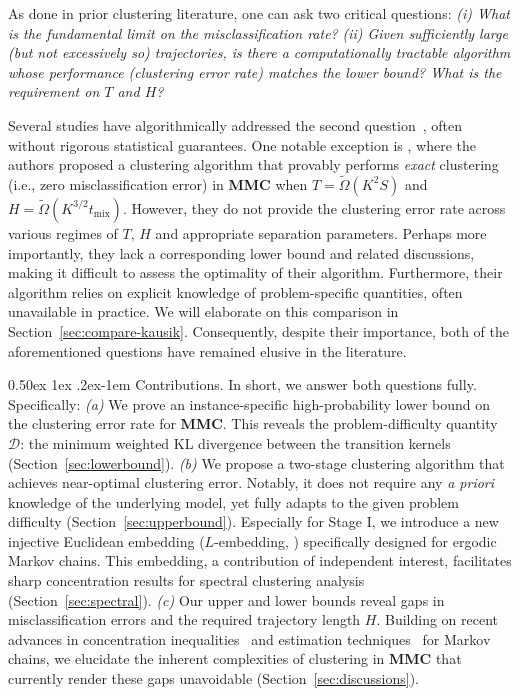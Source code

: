 \documentclass[twoside]{article}
\makeatletter
\renewcommand{\paragraph}{%
  \@startsection{paragraph}{4}%
  {\z@}{0.50ex \@plus 1ex \@minus .2ex}{-1em}%
  {\normalfont\normalsize\bfseries}%
}
\def\gD{{\mathcal{D}}}
\theoremstyle{plain}
\newcommand{\mix}{\mathrm{mix}}
\makeatother
\begin{document}
As done in prior clustering literature, one can ask two critical questions:
\emph{(i) What is the fundamental limit on the misclassification rate?} \emph{(ii) Given sufficiently large (but not excessively so) trajectories, is there a \textit{computationally tractable} algorithm whose performance (clustering error rate) matches the lower bound? What is the requirement on $T$ and $H$?}




Several studies have algorithmically addressed the second question~\citep{gupta2016mixture,kausik2023mixture,spaeh2023mixture,spaeh2024mixture1,spaeh2024mixture2}, often without rigorous statistical guarantees.
One notable exception is \cite{kausik2023mixture}, where the authors proposed a clustering algorithm that provably performs \textit{exact} clustering (i.e., zero misclassification error) in \textbf{MMC} when $T = \widetilde{\Omega}(K^2 S)$ and $H = \widetilde{\Omega}(K^{3/2} t_\mix)$.
However, they do not provide the clustering error rate across various regimes of $T$, $H$ and appropriate separation parameters.
Perhaps more importantly, they lack a corresponding lower bound and related discussions, making it difficult to assess the optimality of their algorithm.
Furthermore, their algorithm relies on explicit knowledge of problem-specific quantities, often unavailable in practice.
We will elaborate on this comparison in Section~\ref{sec:compare-kausik}.
Consequently, despite their importance, both of the aforementioned questions have remained elusive in the literature.




\paragraph{Contributions.}
In short, we answer both questions fully.
Specifically:
\emph{(a)} We prove an instance-specific high-probability lower bound on the clustering error rate for \textbf{MMC}. This reveals the problem-difficulty quantity $\gD$: the minimum weighted KL divergence between the transition kernels (Section~\ref{sec:lowerbound}).
\emph{(b)} We propose a two-stage clustering algorithm that achieves near-optimal clustering error. Notably, it does not require any \textit{a priori} knowledge of the underlying model, yet fully adapts to the given problem difficulty (Section~\ref{sec:upperbound}). Especially for Stage I, we introduce a new injective Euclidean embedding ($L$-embedding, ) specifically designed for ergodic Markov chains. This embedding, a contribution of independent interest, facilitates sharp concentration results for spectral clustering analysis (Section~\ref{sec:spectral}).
\emph{(c)} Our upper and lower bounds reveal gaps in misclassification errors and the required trajectory length $H$. Building on recent advances in concentration inequalities~\citep{paulin2015markov, fan2021hoeffding} and estimation techniques~\citep{wolfer2021markov} for Markov chains, we elucidate the inherent complexities of clustering in \textbf{MMC} that currently render these gaps unavoidable (Section~\ref{sec:discussions}).
\end{document}
